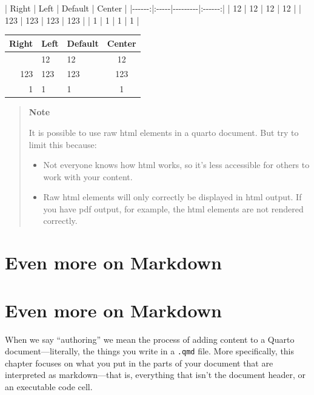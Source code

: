 \documentclass[
  letterpaper,
  DIV=11,
  numbers=noendperiod,
  oneside]{scrreprt}
\newenvironment{Shaded}{\begin{snugshade}}{\end{snugshade}}
\newcommand{\InformationTok}[1]{\textcolor[rgb]{0.37,0.37,0.37}{#1}}
\newcounter{none} %
\providecommand{\tightlist}{%
  \setlength{\itemsep}{0pt}\setlength{\parskip}{0pt}}
\begin{document}
\begin{tcolorbox}
\begin{Shaded}
\begin{Highlighting}[]
\InformationTok{    | Right | Left | Default | Center |}
\InformationTok{    |{-}{-}{-}{-}{-}{-}:|:{-}{-}{-}{-}{-}|{-}{-}{-}{-}{-}{-}{-}{-}{-}|:{-}{-}{-}{-}{-}{-}:|}
\InformationTok{    |   12  |  12  |    12   |    12  |}
\InformationTok{    |  123  |  123 |   123   |   123  |}
\InformationTok{    |    1  |    1 |     1   |     1  |}
\end{Highlighting}
\end{Shaded}

{\def\LTcaptype{none} %
\begin{longtable}[]{@{}rllc@{}}
\toprule\noalign{}
Right & Left & Default & Center \\
\midrule\noalign{}
\endhead
\bottomrule\noalign{}
\endlastfoot
12 & 12 & 12 & 12 \\
123 & 123 & 123 & 123 \\
1 & 1 & 1 & 1 \\
\end{longtable}
}

\begin{quote}
\textbf{Note}

It is possible to use raw html elements in a quarto document. But try to
limit this because:

\begin{itemize}
\tightlist
\item
  Not everyone knows how html works, so it's less accessible for others
  to work with your content.
\item
  Raw html elements will only correctly be displayed in html output. If
  you have pdf output, for example, the html elements are not rendered
  correctly.
\end{itemize}
\end{quote}

\chapter{Even more on Markdown}\label{even-more-on-markdown}

\chapter{Even more on Markdown}\label{sec-authoring}

When we say ``authoring'' we mean the process of adding content to a
Quarto document---literally, the things you write in a \texttt{.qmd}
file. More specifically, this chapter focuses on what you put in the
parts of your document that are interpreted as markdown---that is,
everything that isn't the document header, or an executable code cell.


\end{tcolorbox}
\end{document}
